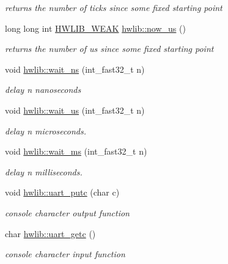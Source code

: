 \begin{DoxyCompactItemize}
\begin{DoxyCompactList}\small\item\em returns the number of ticks since some fixed starting point \end{DoxyCompactList}\item 
long long int \hyperlink{hwlib-defines_8hpp_a04be4340016df60d6636c1d1c6d94fc9}{H\+W\+L\+I\+B\+\_\+\+W\+E\+AK} \hyperlink{hwlib-due_8hpp_aa96fdf113860b88c1d99f4152c7bf28f}{hwlib\+::now\+\_\+us} ()
\begin{DoxyCompactList}\small\item\em returns the number of us since some fixed starting point \end{DoxyCompactList}\item 
void \hyperlink{hwlib-due_8hpp_a9c01a1d0319f5eadd8926e66aea19aa0}{hwlib\+::wait\+\_\+ns} (int\+\_\+fast32\+\_\+t n)
\begin{DoxyCompactList}\small\item\em delay n nanoseconds \end{DoxyCompactList}\item 
void \hyperlink{hwlib-due_8hpp_a0096b739fc566c896366ecbd3113cc1e}{hwlib\+::wait\+\_\+us} (int\+\_\+fast32\+\_\+t n)
\begin{DoxyCompactList}\small\item\em delay n microseconds. \end{DoxyCompactList}\item 
void \hyperlink{hwlib-due_8hpp_a6119aa5d3034176aa1515ef4bb193044}{hwlib\+::wait\+\_\+ms} (int\+\_\+fast32\+\_\+t n)
\begin{DoxyCompactList}\small\item\em delay n milliseconds. \end{DoxyCompactList}\item 
void \hyperlink{hwlib-due_8hpp_a67bf0f42feb7032baece1dbb91048324}{hwlib\+::uart\+\_\+putc} (char c)
\begin{DoxyCompactList}\small\item\em console character output function \end{DoxyCompactList}\item 
char \hyperlink{hwlib-due_8hpp_a0f433c14b5302d476ed723a38862d9d3}{hwlib\+::uart\+\_\+getc} ()
\begin{DoxyCompactList}\small\item\em console character input function \end{DoxyCompactList}\end{DoxyCompactItemize}
